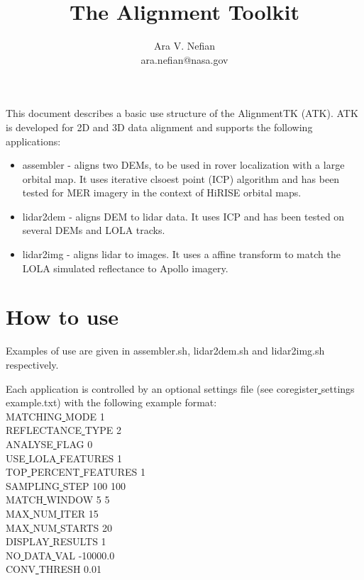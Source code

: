 \documentclass[12pt]{article}
\begin{document}
\title {The Alignment Toolkit}
\author{Ara V. Nefian\\
ara.nefian@nasa.gov}
\maketitle

This document describes a basic use structure of the AlignmentTK (ATK). ATK is developed for 2D and 3D data alignment and supports the 
following applications:
\begin{itemize}
\item assembler - aligns two DEMs, to be used in rover localization with a large orbital map. It uses iterative clsoest point (ICP) algorithm and has 
been tested for MER imagery in the context of HiRISE orbital maps.
\item lidar2dem - aligns DEM to lidar data. It uses ICP and has been tested on several DEMs and LOLA tracks.
\item lidar2img - aligns lidar to images. It uses a affine transform to match the LOLA simulated reflectance to Apollo imagery. 
\end{itemize} 

\section{How to use}
Examples of use are given in assembler.sh, lidar2dem.sh and lidar2img.sh respectively.

Each application is controlled by an optional settings file (see coregister\underline{ }settings\underline{ }example.txt) with the following example format:\\
MATCHING\underline{ }MODE 1\\
REFLECTANCE\underline{ }TYPE 2\\
ANALYSE\underline{ }FLAG 0\\
USE\underline{ }LOLA\underline{ }FEATURES 1\\
TOP\underline{ }PERCENT\underline{ }FEATURES 1\\
SAMPLING\underline{ }STEP 100 100\\
MATCH\underline{ }WINDOW 5 5\\
MAX\underline{ }NUM\underline{ }ITER 15\\
MAX\underline{ }NUM\underline{ }STARTS 20\\
DISPLAY\underline{ }RESULTS 1\\
NO\underline{ }DATA\underline{ }VAL -10000.0\\
CONV\underline{ }THRESH 0.01\\
\end{document}
